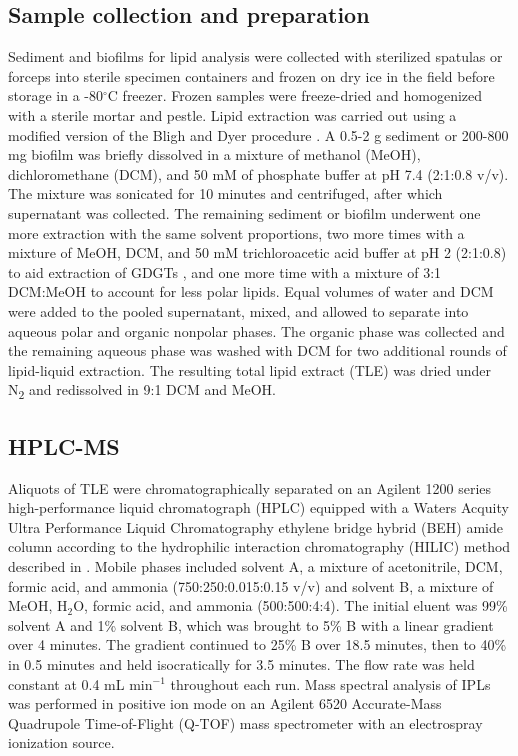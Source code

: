 \subsection{Sample collection and preparation} Sediment and biofilms for lipid analysis were collected with sterilized spatulas or forceps into sterile specimen containers and frozen on dry ice in the field before storage in a -80$^{\circ}$C freezer. Frozen samples were freeze-dried and homogenized with a sterile mortar and pestle. Lipid extraction was carried out using a modified version of the Bligh and Dyer procedure \citep{white1998signature}. A 0.5-2 g sediment or 200-800 mg biofilm was briefly dissolved in a mixture of methanol (MeOH), dichloromethane (DCM), and 50 mM of phosphate buffer at pH 7.4 (2:1:0.8 v/v). The mixture was sonicated for 10 minutes and centrifuged, after which supernatant was collected. The remaining sediment or biofilm underwent one more extraction with the same solvent proportions, two more times with a mixture of MeOH, DCM, and 50 mM trichloroacetic acid buffer at pH 2 (2:1:0.8) to aid extraction of GDGTs \citep{nishihara1987extraction}, and one more time with a mixture of 3:1 DCM:MeOH to account for less polar lipids. Equal volumes of water and DCM were added to the pooled supernatant, mixed, and allowed to separate into aqueous polar and organic nonpolar phases. The organic phase was collected and the remaining aqueous phase was washed with DCM for two additional rounds of lipid-liquid extraction. The resulting total lipid extract (TLE) was dried under N\textsubscript{2} and redissolved in 9:1 DCM and MeOH.

\subsection{HPLC-MS} Aliquots of TLE were chromatographically separated on an Agilent 1200 series high-performance liquid chromatograph (HPLC) equipped with a Waters Acquity Ultra Performance Liquid Chromatography ethylene bridge hybrid (BEH) amide column according to the hydrophilic interaction chromatography (HILIC) method described in \cite{wormer2013application}. Mobile phases included solvent A, a mixture of acetonitrile, DCM, formic acid, and ammonia (750:250:0.015:0.15 v/v) and solvent B, a mixture of MeOH, H$_{2}$O, formic acid, and ammonia (500:500:4:4). The initial eluent was 99\% solvent A and 1\% solvent B, which was brought to 5\% B with a linear gradient over 4 minutes. The gradient continued to 25\% B over 18.5 minutes, then to 40\% in 0.5 minutes and held isocratically for 3.5 minutes. The flow rate was held constant at 0.4 mL min$^{-1}$ throughout each run. Mass spectral analysis of IPLs was performed in positive ion mode on an Agilent 6520 Accurate-Mass Quadrupole Time-of-Flight (Q-TOF) mass spectrometer with an electrospray ionization source.

